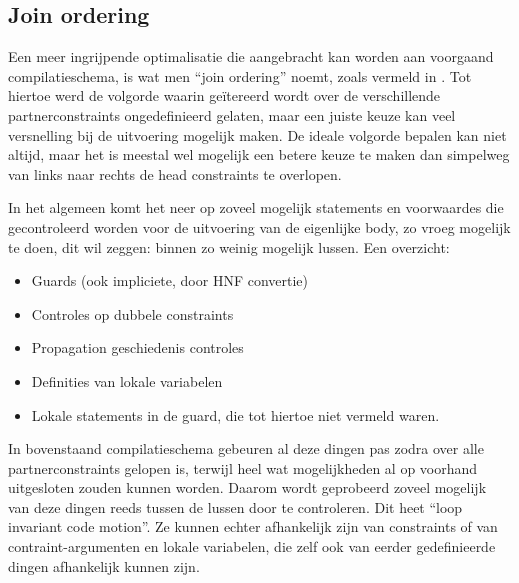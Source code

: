 {\subsection{Join ordering} \label{sec:joinorder}


Een meer ingrijpende optimalisatie die aangebracht kan worden aan voorgaand compilatieschema, is wat men ``join ordering'' noemt, zoals vermeld in \cite{duck:optimizing}. Tot hiertoe werd de volgorde waarin ge\"itereerd wordt over de verschillende partnerconstraints ongedefinieerd gelaten, maar een juiste keuze kan veel versnelling bij de uitvoering mogelijk maken. De ideale volgorde bepalen kan niet altijd, maar het is meestal wel mogelijk een betere keuze te maken dan simpelweg van links naar rechts de head constraints te overlopen.

In het algemeen komt het neer op zoveel mogelijk statements en voorwaardes die gecontroleerd worden voor de uitvoering van de eigenlijke body, zo vroeg mogelijk te doen, dit wil zeggen: binnen zo weinig mogelijk lussen. Een overzicht: \begin{itemize}
  \item Guards (ook impliciete, door HNF convertie)
  \item Controles op dubbele constraints
  \item Propagation geschiedenis controles
  \item Definities van lokale variabelen
  \item Lokale statements in de guard, die tot hiertoe niet vermeld waren.
\end{itemize}
In bovenstaand compilatieschema gebeuren al deze dingen pas zodra over alle partnerconstraints gelopen is, terwijl heel wat mogelijkheden al op voorhand uitgesloten zouden kunnen worden. Daarom wordt geprobeerd zoveel mogelijk van deze dingen reeds tussen de lussen door te controleren. Dit heet ``loop invariant code motion''. Ze kunnen echter afhankelijk zijn van constraints of van contraint-argumenten en lokale variabelen, die zelf ook van eerder gedefinieerde dingen afhankelijk kunnen zijn.

}
